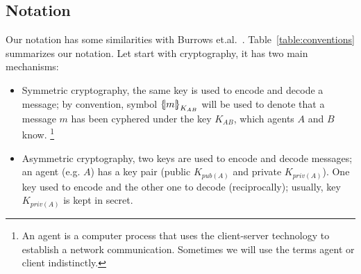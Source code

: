 \subsection{Notation}
\label{sec:notation}

Our notation has some similarities with Burrows et.al.~\cite{Burrows1990}. 
Table~\ref{table:conventions} summarizes our notation. Let start with
cryptography, it has two main mechanisms:
\begin{itemize}
  \item Symmetric cryptography, the same key is used to encode and
    decode a message; by convention, symbol $\fat{m}_{K_{AB}}$ will be
    used to denote that a message $m$ has been cyphered under the key
    $K_{AB}$, which agents $A$ and $B$ know. \footnote{An agent is a 
        computer process that uses the client-server technology to 
        establish a network communication. Sometimes we will use the 
        terms agent or client indistinctly.} 
  \item Asymmetric cryptography, two keys are used to encode and
    decode messages; an agent (e.g. $A$) has a key pair
    (public $K_{pub(A)}$ and private $K_{priv(A)}$). One key used to
    encode and the other one to decode (reciprocally); usually, key
    $K_{priv(A)}$ is kept in secret. 
\end{itemize}

